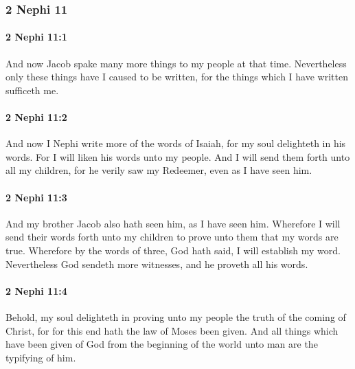 	\subsubsection{2 Nephi 11} %
		\label{2NEPHI-11}
		
		\paragraph{2 Nephi 11:1} %
			\label{2NEPHI-11-1}

			And now Jacob spake many more things to my people at that time.
			Nevertheless only these things have I caused to be written,
			for the things which I have written sufficeth me.

		\paragraph{2 Nephi 11:2} %
			\label{2NEPHI-11-2}

			And now I Nephi write more of the words of Isaiah,
			for my soul delighteth in his words.
			For I will liken his words unto my people.
			And I will send them forth unto all my children,
			for he verily saw my Redeemer, even as I have seen him.

		\paragraph{2 Nephi 11:3} %
			\label{2NEPHI-11-3}

			And my brother Jacob also hath seen him, as I have seen him.
			Wherefore I will send their words forth unto my children
			to prove unto them that my words are true.
			Wherefore by the words of three, God hath said, I will establish my word.
			Nevertheless God sendeth more witnesses, and he proveth all his words.

		\paragraph{2 Nephi 11:4} %
			\label{2NEPHI-11-4}

			Behold, my soul delighteth in proving unto my people
			the truth of the coming of Christ,
			for for this end hath the law of Moses been given.
			And all things which have been given of God
			from the beginning of the world unto man
			are the typifying of him.

